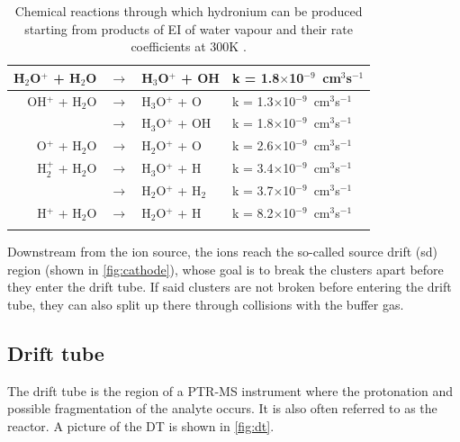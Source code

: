 




\begin{table}[t]
\centering
\caption{Chemical reactions through which hydronium can be produced starting from products of EI of water vapour and their rate coefficients at 300K \cite{doi:10.1002/rcm.1290030312}.}
\label{tb:reactions}
\begin{tabular}{ rcl l }
\toprule
\quad H$_2$O$^+$ + H$_2$O 	&$\rightarrow$& H$_3$O$^+$ + OH  	& k = 1.8$\times$10$^{-9}$\, cm$^{3}$s$^{-1}$ \qquad \\ \midrule
OH$^+$ + H$_2$O  	&$\rightarrow$& H$_3$O$^+$ + O  		& k = 1.3$\times$10$^{-9}$\, cm$^{3}$s$^{-1}$  \\
				& $\rightarrow$& H$_3$O$^+$ + OH		& k = 1.8$\times$10$^{-9}$\, cm$^{3}$s$^{-1}$	  \\ \midrule
O$^+$ + H$_2$O  	&$\rightarrow$& H$_2$O$^+$ + O  		& k = 2.6$\times$10$^{-9}$\, cm$^{3}$s$^{-1}$   \\ \midrule
H$_2^+$ + H$_2$O  	&$\rightarrow$& H$_3$O$^+$ + H  		& k = 3.4$\times$10$^{-9}$\, cm$^{3}$s$^{-1}$   \\
				& $\rightarrow$& H$_2$O$^+$ + H$_2$ 		& k = 3.7$\times$10$^{-9}$\, cm$^{3}$s$^{-1}$	  \\ \midrule
H$^+$ + H$_2$O  	&$\rightarrow$& H$_2$O$^+$ + H  		& k = 8.2$\times$10$^{-9}$\, cm$^{3}$s$^{-1}$   \\ \bottomrule
\\
\end{tabular}
\end{table}



Downstream from the ion source, the ions reach the so-called source drift (\acrshort{sd}) region (shown in  \autoref{fig:cathode}), whose goal is to break the clusters apart before they enter the drift tube. If said clusters are not broken before entering the drift tube, they can also  split up there through collisions with the buffer gas.










\subsection{Drift tube}
The drift tube %
is the region of a PTR-MS instrument where the protonation and possible fragmentation of the analyte occurs. It is also often referred to as the reactor. A picture of the DT is shown in \autoref{fig:dt}.

